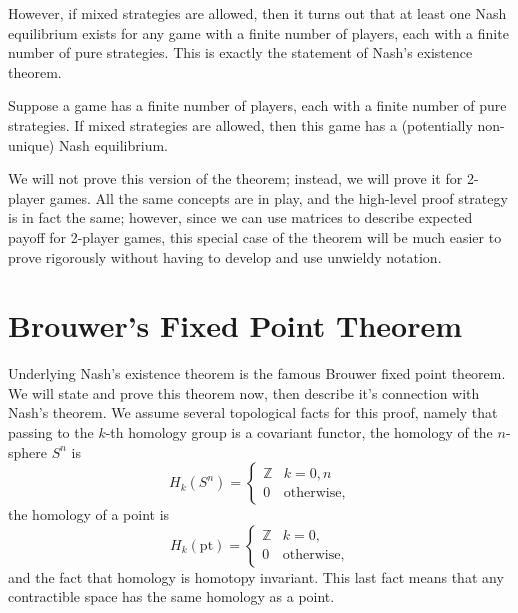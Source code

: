 \documentclass[twoside,10pt]{article}
\begin{document}
However, if mixed strategies are allowed, then it turns out that at least one Nash equilibrium exists for any game with a finite number of players, each with a finite number of pure strategies. This is exactly the statement of Nash's existence theorem.

\begin{thrm}
	Suppose a game has a finite number of players, each with a finite number of pure strategies. If mixed strategies are allowed, then this game has a (potentially non-unique) Nash equilibrium.
\end{thrm}

We will not prove this version of the theorem; instead, we will prove it for 2-player games. All the same concepts are in play, and the high-level proof strategy is in fact the same; however, since we can use matrices to describe expected payoff for 2-player games, this special case of the theorem will be much easier to prove rigorously without having to develop and use unwieldy notation.


\section{Brouwer's Fixed Point Theorem}

Underlying Nash's existence theorem is the famous Brouwer fixed point theorem. We will state and prove this theorem now, then describe it's connection with Nash's theorem. We assume several topological facts for this proof, namely that passing to the $k$-th homology group is a covariant functor, the homology of the $n$-sphere $S^{n}$ is
\[
	H_{k}(S^{n}) =
	\begin{cases}
		\mathbb{Z} & k=0,n \\
		0 & \text{otherwise},
	\end{cases}
\] 
the homology of a point is
\[
	H_{k}(\text{pt}) =
	\begin{cases}
		\mathbb{Z} & k=0,\\
		0 & \text{otherwise},
	\end{cases}
\] and the fact that homology is homotopy invariant. This last fact means that any contractible space has the same homology as a point.

\pagebreak
\end{document}
